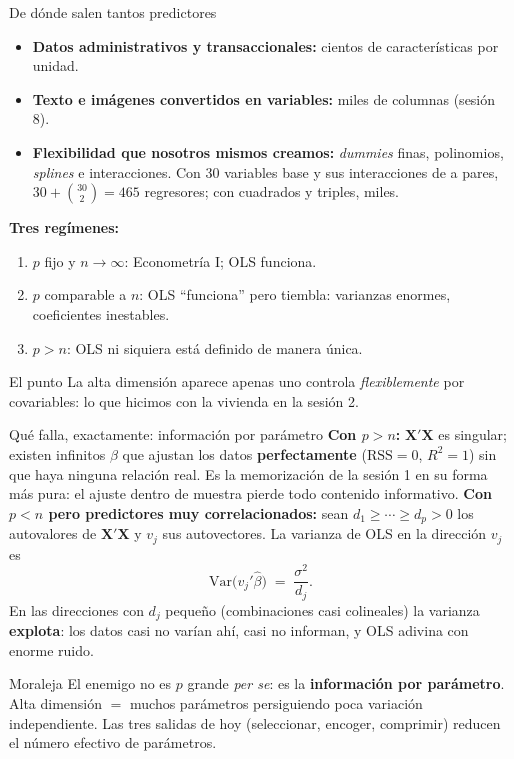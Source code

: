 \documentclass{beamer}
\newcommand{\Var}{\mathrm{Var}}
\newcommand{\1}{\mathbb{I}}
\newcommand{\RSS}{\mathrm{RSS}}
\begin{document}
\begin{frame}{De dónde salen tantos predictores}
\small
\begin{itemize}\itemsep4pt
  \item \textbf{Datos administrativos y transaccionales:} cientos de características por unidad. \pause
  \item \textbf{Texto e imágenes convertidos en variables:} miles de columnas (sesión 8). \pause
  \item \textbf{Flexibilidad que nosotros mismos creamos:} \emph{dummies} finas, polinomios, \emph{splines} e interacciones. Con 30 variables base y sus interacciones de a pares, $30 + \binom{30}{2} = 465$ regresores; con cuadrados y triples, miles. \pause
\end{itemize}
\vspace{0.1cm}
\textbf{Tres regímenes:}
\begin{enumerate}\itemsep3pt
  \item $p$ fijo y $n \to \infty$: Econometría I; OLS funciona.
  \item $p$ comparable a $n$: OLS ``funciona'' pero tiembla: varianzas enormes, coeficientes inestables.
  \item $p > n$: OLS ni siquiera está definido de manera única.
\end{enumerate}
\pause
\begin{block}{El punto}
La alta dimensión aparece apenas uno controla \emph{flexiblemente} por covariables: lo que hicimos con la vivienda en la sesión 2.
\end{block}
\end{frame}

\begin{frame}{Qué falla, exactamente: información por parámetro}
\small
\textbf{Con $p > n$:} $\mathbf{X}'\mathbf{X}$ es singular; existen infinitos $\beta$ que ajustan los datos \textbf{perfectamente} ($\RSS = 0$, $R^2 = 1$) sin que haya ninguna relación real. Es la memorización de la sesión 1 en su forma más pura: el ajuste dentro de muestra pierde todo contenido informativo.
\pause
\vspace{0.1cm}
\textbf{Con $p < n$ pero predictores muy correlacionados:} sean $d_1 \geq \cdots \geq d_p > 0$ los autovalores de $\mathbf{X}'\mathbf{X}$ y $v_j$ sus autovectores. La varianza de OLS en la dirección $v_j$ es
\[ \Var\big(v_j'\hat{\beta}\big) \;=\; \frac{\sigma^2}{d_j}. \]
En las direcciones con $d_j$ pequeño (combinaciones casi colineales) la varianza \textbf{explota}: los datos casi no varían ahí, casi no informan, y OLS adivina con enorme ruido.
\pause
\vspace{0.1cm}
\begin{block}{Moraleja}
El enemigo no es $p$ grande \emph{per se}: es la \textbf{información por parámetro}. Alta dimensión $=$ muchos parámetros persiguiendo poca variación independiente. Las tres salidas de hoy (seleccionar, encoger, comprimir) reducen el número efectivo de parámetros.
\end{block}
\end{frame}
\end{document}
